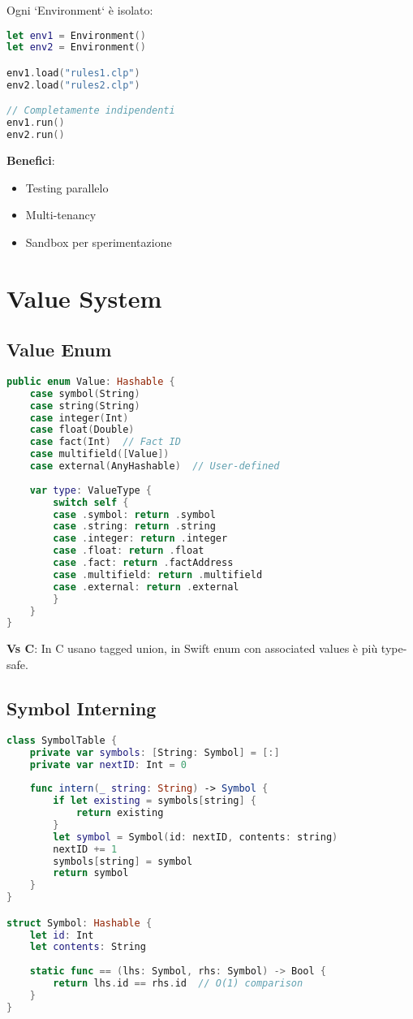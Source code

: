 Ogni `Environment` è isolato:

\begin{lstlisting}[language=Swift]
let env1 = Environment()
let env2 = Environment()

env1.load("rules1.clp")
env2.load("rules2.clp")

// Completamente indipendenti
env1.run()  
env2.run()
\end{lstlisting}

\textbf{Benefici}:
\begin{itemize}
\item Testing parallelo
\item Multi-tenancy
\item Sandbox per sperimentazione
\end{itemize}

\section{Value System}

\subsection{Value Enum}

\begin{lstlisting}[language=Swift]
public enum Value: Hashable {
    case symbol(String)
    case string(String)
    case integer(Int)
    case float(Double)
    case fact(Int)  // Fact ID
    case multifield([Value])
    case external(AnyHashable)  // User-defined
    
    var type: ValueType {
        switch self {
        case .symbol: return .symbol
        case .string: return .string
        case .integer: return .integer
        case .float: return .float
        case .fact: return .factAddress
        case .multifield: return .multifield
        case .external: return .external
        }
    }
}
\end{lstlisting}

\textbf{Vs C}: In C usano tagged union, in Swift enum con associated values è più type-safe.

\subsection{Symbol Interning}

\begin{lstlisting}[language=Swift]
class SymbolTable {
    private var symbols: [String: Symbol] = [:]
    private var nextID: Int = 0
    
    func intern(_ string: String) -> Symbol {
        if let existing = symbols[string] {
            return existing
        }
        let symbol = Symbol(id: nextID, contents: string)
        nextID += 1
        symbols[string] = symbol
        return symbol
    }
}

struct Symbol: Hashable {
    let id: Int
    let contents: String
    
    static func == (lhs: Symbol, rhs: Symbol) -> Bool {
        return lhs.id == rhs.id  // O(1) comparison
    }
}
\end{lstlisting}

